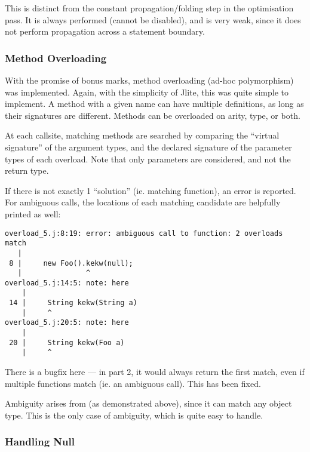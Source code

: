 \documentclass[12pt]{article}
\begin{document}
This is distinct from the constant propagation/folding step in the optimisation pass. It is always performed
(cannot be disabled), and is very weak, since it does not perform propagation across a statement boundary.




\subsubsection{Method Overloading}

With the promise of bonus marks, method overloading (ad-hoc polymorphism) was implemented. Again, with the
simplicity of Jlite, this was quite simple to implement. A method with a given name can have multiple
definitions, as long as their signatures are different. Methods can be overloaded on arity, type, or both.

At each callsite, matching methods are searched by comparing the \enquote{virtual signature} of the argument
types, and the declared signature of the parameter types of each overload. Note that only parameters are
considered, and not the return type.

If there is not exactly 1 \enquote{solution} (ie. matching function), an error is reported. For ambiguous
calls, the locations of each matching candidate are helpfully printed as well:

\begin{verbatim}
overload_5.j:8:19: error: ambiguous call to function: 2 overloads match
   |
 8 |     new Foo().kekw(null);
   |               ^
overload_5.j:14:5: note: here
    |
 14 |     String kekw(String a)
    |     ^
overload_5.j:20:5: note: here
    |
 20 |     String kekw(Foo a)
    |     ^
\end{verbatim}

There is a bugfix here --- in part 2, it would always return the first match, even if multiple functions match
(ie. an ambiguous call). This has been fixed.

Ambiguity arises from  (as demonstrated above), since it can match any object type. This is the only
case of ambiguity, which is quite easy to handle.



\subsubsection{Handling Null}
\end{document}
